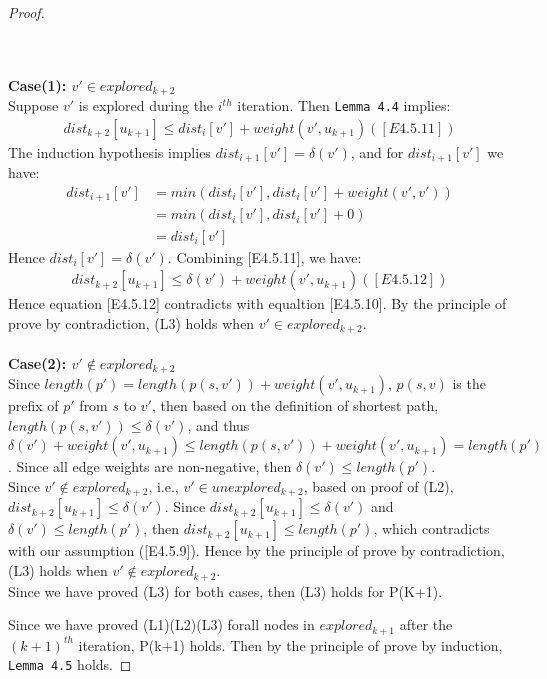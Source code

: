 \begin{proof}
\begin{itemize}
\begin{enumerate}
  \\\\
  \textbf{Case(1): $v' \in explored_{k+2}$}
  \\
  Suppose $v'$ is explored during the $i^{th}$ iteration. Then \texttt{Lemma 4.4} implies: 
  \begin{align*}
    dist_{k+2}[u_{k+1}] \leq dist_i[v'] + weight(v', u_{k+1}) ([E4.5.11])
  \end{align*}
  The induction hypothesis implies $dist_{i+1}[v'] = \delta(v')$, and for $dist_{i+1}[v']$ we have: 
  \begin{align*}
    dist_{i+1}[v'] &= min(dist_i[v'], dist_i[v'] + weight(v', v')) \\
                   &= min(dist_i[v'], dist_i[v'] + 0) \\
                   &= dist_i[v']
  \end{align*}
  Hence $dist_i[v'] = \delta(v')$. Combining [E4.5.11], we have: 
  \begin{align*}
    dist_{k+2}[u_{k+1}] \leq \delta(v') + weight(v', u_{k+1}) ([E4.5.12])
  \end{align*}
  Hence equation [E4.5.12] contradicts with equaltion [E4.5.10]. By the principle of prove by contradiction, (L3) holds when $v' \in explored_{k+2}$. 
  \\\\
  \textbf{Case(2): $v' \notin explored_{k+2}$}
  \\
  Since $length(p') = length(p(s, v')) + weight(v', u_{k+1})$, $p(s, v)$ is the prefix of $p'$ from $s$ to $v'$, then based on the definition of shortest path, $length(p(s, v')) \leq \delta(v')$, and thus $\delta(v') + weight(v', u_{k+1}) \leq length(p(s, v')) + weight(v', u_{k+1}) = length(p')$. Since all edge weights are non-negative, then $\delta(v') \leq length(p')$.
  \\
  Since $v' \notin explored_{k+2}$, i.e., $v' \in unexplored_{k+2}$, based on proof of (L2), $dist_{k+2}[u_{k+1}] \leq \delta(v')$. Since $dist_{k+2}[u_{k+1}] \leq \delta(v')$ and $\delta(v') \leq length(p')$, then $dist_{k+2}[u_{k+1}] \leq length(p')$, which contradicts with our assumption ([E4.5.9]). Hence by the principle of prove by contradiction, (L3) holds when $v' \notin explored_{k+2}$. 
  \\
  Since we have proved (L3) for both cases, then (L3) holds for P(K+1). 
  \end{enumerate}
\end{itemize}
Since we have proved (L1)(L2)(L3) forall nodes in $explored_{k+1}$ after the $(k+1)^{th}$ iteration, P(k+1) holds. Then by the principle of prove by induction, \texttt{Lemma 4.5} holds. 
\end{proof}